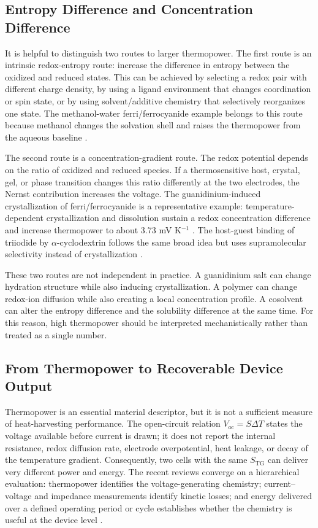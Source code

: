 \documentclass[a4paper,12pt]{report}
\begin{document}
\subsection{Entropy Difference and Concentration Difference}

It is helpful to distinguish two routes to larger thermopower. The first route
is an intrinsic redox-entropy route: increase the difference in entropy between
the oxidized and reduced states. This can be achieved by selecting a redox pair
with different charge density, by using a ligand environment that changes
coordination or spin state, or by using solvent/additive chemistry that
selectively reorganizes one state. The methanol-water ferri/ferrocyanide
example belongs to this route because methanol changes the solvation shell and
raises the thermopower from the aqueous baseline \citep{kim2017high}.

The second route is a concentration-gradient route. The redox potential depends
on the ratio of oxidized and reduced species. If a thermosensitive host,
crystal, gel, or phase transition changes this ratio differently at the two
electrodes, the Nernst contribution increases the voltage. The
guanidinium-induced crystallization of ferri/ferrocyanide is a representative
example: temperature-dependent crystallization and dissolution sustain a redox
concentration difference and increase thermopower to about 3.73 mV K$^{-1}$
\citep{yu2020thermosensitive}. The host-guest binding of triiodide by
$\alpha$-cyclodextrin follows the same broad idea but uses supramolecular
selectivity instead of crystallization \citep{zhou2016supramolecular}.

These two routes are not independent in practice. A guanidinium salt can change
hydration structure while also inducing crystallization. A polymer can change
redox-ion diffusion while also creating a local concentration profile. A
cosolvent can alter the entropy difference and the solubility difference at the
same time. For this reason, high thermopower should be interpreted mechanistically
rather than treated as a single number.

\subsection{From Thermopower to Recoverable Device Output}

Thermopower is an essential material descriptor, but it is not a sufficient
measure of heat-harvesting performance. The open-circuit relation
$V_{\mathrm{oc}}=S\Delta T$ states the voltage available before current is
drawn; it does not report the internal resistance, redox diffusion rate,
electrode overpotential, heat leakage, or decay of the temperature gradient.
Consequently, two cells with the same $S_{\mathrm{TG}}$ can deliver very
different power and energy. The recent reviews converge on a hierarchical
evaluation: thermopower identifies the voltage-generating chemistry;
current--voltage and impedance measurements identify kinetic losses; and
energy delivered over a defined operating period or cycle establishes whether
the chemistry is useful at the device level
\citep{duan2021liquid,jabeen2024recent,shang2026pushing,xu2026birdseye}.
\end{document}
